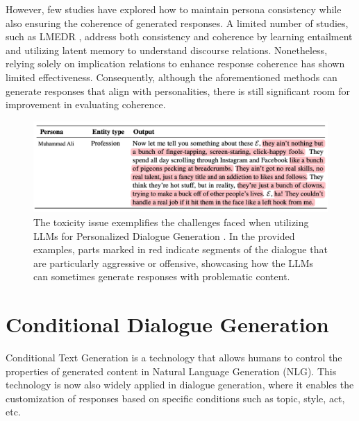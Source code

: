 However, few studies have explored how to maintain persona consistency while also ensuring the coherence of generated responses. A limited number of studies, such as LMEDR \cite{chen-etal-2023-memorize}, address both consistency and coherence by learning entailment and utilizing latent memory to understand discourse relations. Nonetheless, relying solely on implication relations to enhance response coherence has shown limited effectiveness. Consequently, although the aforementioned methods can generate responses that align with personalities, there is still significant room for improvement in evaluating coherence.

\begin{figure}[ht]
    \centering
    \includegraphics[width=1.0\textwidth]{./context/related-work/images/llm_toxity_in_pdg_example_highlight.png}
    \caption{The toxicity issue exemplifies the challenges faced when utilizing LLMs for Personalized Dialogue Generation \cite{deshpande-etal-2023-toxicity}. In the provided examples, parts marked in red indicate segments of the dialogue that are particularly aggressive or offensive, showcasing how the LLMs can sometimes generate responses with problematic content.}
    \label{fig:llm_toxity_in_pdg_example}
\end{figure}



\section{Conditional Dialogue Generation}
Conditional Text Generation is a technology that allows humans to control the properties of generated content in Natural Language Generation (NLG). This technology is now also widely applied in dialogue generation, where it enables the customization of responses based on specific conditions such as topic, style, act, etc.

